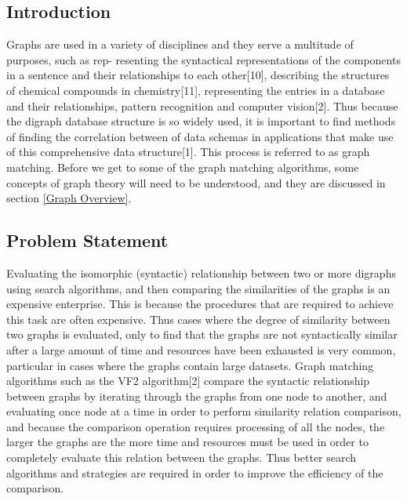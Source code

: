 \label{Introduction}
\subsection{Introduction}
Graphs are used in a variety of disciplines and they serve a multitude of purposes, such as rep-
resenting the syntactical representations of the components in a sentence and their relationships
to each other[10], describing the structures of chemical compounds in chemistry[11], representing
the entries in a database and their relationships, pattern recognition and computer vision[2]. Thus
because the digraph database structure is so widely used, it is important to find methods of finding
the correlation between of data schemas in applications that make use of this comprehensive data
structure[1]. This process is referred to as graph matching. Before we get to some of the graph
matching algorithms, some concepts of graph theory will need to be understood, and they are discussed in section \ref{Graph Overview}.

\subsection{Problem Statement}
Evaluating the isomorphic (syntactic) relationship between two or more digraphs
using search algorithms, and then comparing the similarities of the graphs is an expensive enterprise. 
This is because the procedures that are required to achieve this task are often expensive.
Thus cases where the degree of similarity between two graphs is evaluated,
only to find that the graphs are not syntactically similar after a large amount of time and resources
have been exhausted is very common, particular in cases where the graphs contain large datasets.\newline\newline
Graph matching algorithms such as the VF2 algorithm[2] compare the syntactic relationship between graphs by iterating through the graphs
from one node to another, and evaluating once node at a time in order to perform similarity relation comparison, and because the comparison
operation requires processing of all the nodes, the larger the graphs are the more time and resources must be used in order to completely evaluate this
relation between the graphs. Thus better search algorithms and strategies are required in order to
improve the efficiency of the comparison.

